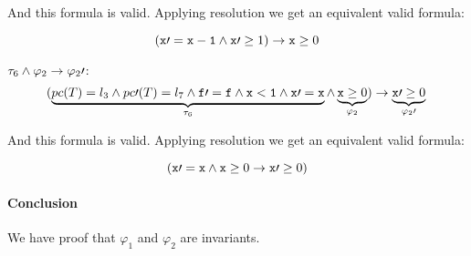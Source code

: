 	And this formula is valid. Applying resolution we get an equivalent valid formula:

	\[
		( \mathtt{x\prime =x-1} \wedge \mathtt{x\prime }\geq 1) \to \mathtt{x} \geq 0
	\]


	\; $\tau_6 \wedge \varphi_2 \to \varphi_2\prime $:
	\begin{equation*}
		(
			\underbrace{pc(T) = l_3 \wedge pc\prime (T) = l_7 \wedge \mathtt{f\prime =f} \wedge \mathtt{x<1} \wedge \mathtt{x\prime =x} }_{\tau_6} \wedge \underbrace{\mathtt{x} \geq 0}_{\varphi_2}
		) 
			\to \underbrace{\mathtt{x}\prime  \geq 0}_{\varphi_2\prime }\\\\
	\end{equation*}
	

	
	And this formula is valid. Applying resolution we get an equivalent valid formula:

	\[
		(
			\mathtt{x\prime =x}  \wedge \mathtt{x}\geq 0 \to \mathtt{x\prime }\geq 0
		)
	\]

\paragraph{Conclusion} We have proof that $\varphi_1$ and $\varphi_2$ are invariants.
